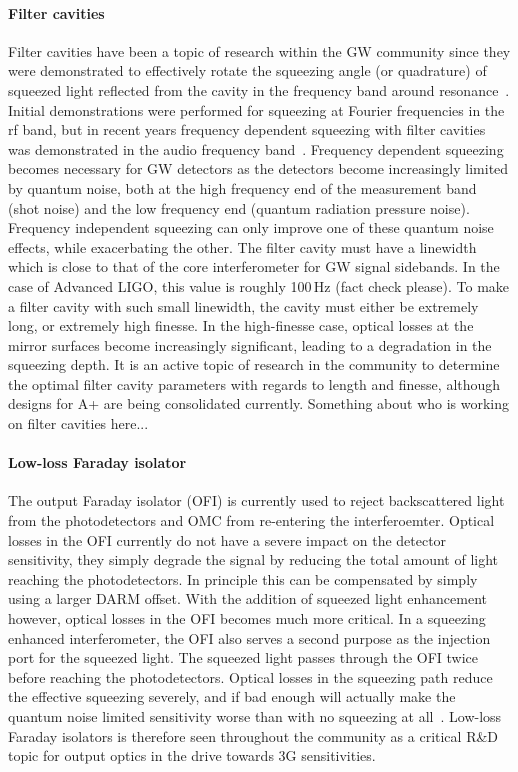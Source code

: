 \paragraph{Filter cavities}
Filter cavities have been a topic of research within the GW community since they were demonstrated to effectively rotate the squeezing angle (or quadrature) of squeezed light reflected from the cavity in the frequency band around resonance~\cite{chelkowski}. Initial demonstrations were performed for squeezing at Fourier frequencies in the rf band, but in recent years frequency dependent squeezing with filter cavities was demonstrated in the audio frequency band~\cite{MITfiltercav}. Frequency dependent squeezing becomes necessary for GW detectors as the detectors become increasingly limited by quantum noise, both at the high frequency end of the measurement band (shot noise) and the low frequency end (quantum radiation pressure noise). Frequency independent squeezing can only improve one of these quantum noise effects, while exacerbating the other. The filter cavity must have a linewidth which is close to that of the core interferometer for GW signal sidebands. In the case of Advanced LIGO, this value is roughly 100\,Hz (fact check please). To make a filter cavity with such small linewidth, the cavity must either be extremely long, or extremely high finesse. In the high-finesse case, optical losses at the mirror surfaces become increasingly significant, leading to a degradation in the squeezing depth. It is an active topic of research in the community to determine the optimal filter cavity parameters with regards to length and finesse, although designs for A+ are being consolidated currently. Something about who is working on filter cavities here... 

\paragraph{Low-loss Faraday isolator}
The output Faraday isolator (OFI) is currently used to reject backscattered light from the photodetectors and OMC from re-entering the interferoemter. Optical losses in the OFI currently do not have a severe impact on the detector sensitivity, they simply degrade the signal by reducing the total amount of light reaching the photodetectors. In principle this can be compensated by simply using a larger DARM offset.
With the addition of squeezed light enhancement however, optical losses in the OFI becomes much more critical. In a squeezing enhanced interferometer, the OFI also serves a second purpose as the injection port for the squeezed light. The squeezed light passes through the OFI twice before reaching the photodetectors. Optical losses in the squeezing path reduce the effective squeezing severely, and if bad enough will actually make the quantum noise limited sensitivity worse than with no squeezing at all~\cite{dwyer}. Low-loss Faraday isolators is therefore seen throughout the community as a critical R\&D topic for output optics in the drive towards 3G sensitivities.

